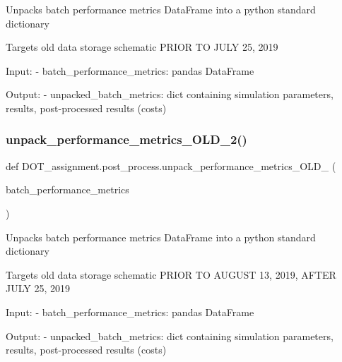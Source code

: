 \begin{DoxyVerb}Unpacks batch performance metrics DataFrame into a python standard dictionary

Targets old data storage schematic PRIOR TO JULY 25, 2019

Input:
- batch_performance_metrics:           pandas DataFrame

Output:
- unpacked_batch_metrics:              dict containing simulation parameters, results, post-processed results (costs)\end{DoxyVerb}
 \mbox{\label{namespace_d_o_t__assignment_1_1post__process_a75c21a161cd5e620becdc3e9caa5c779}} 
\subsubsection{\texorpdfstring{unpack\_performance\_metrics\_OLD\_2()}{unpack\_performance\_metrics\_OLD\_2()}}
{\footnotesize\ttfamily def D\+O\+T\+\_\+assignment.\+post\+\_\+process.\+unpack\+\_\+performance\+\_\+metrics\+\_\+\+O\+L\+D\+\_ (\begin{DoxyParamCaption}\item[{}]{batch\+\_\+performance\+\_\+metrics }\end{DoxyParamCaption})}

\begin{DoxyVerb}Unpacks batch performance metrics DataFrame into a python standard dictionary

Targets old data storage schematic PRIOR TO AUGUST 13, 2019, AFTER JULY 25, 2019

Input:
- batch_performance_metrics:           pandas DataFrame

Output:
- unpacked_batch_metrics:              dict containing simulation parameters, results, post-processed results (costs)\end{DoxyVerb}
 